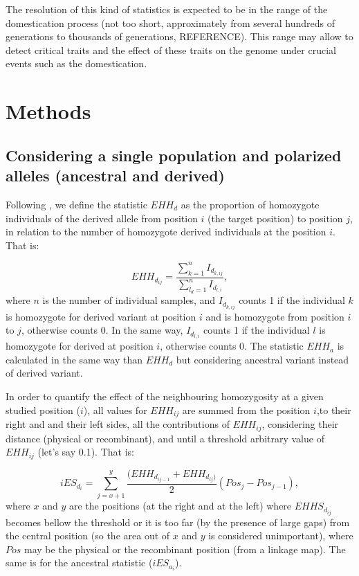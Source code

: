 \documentclass[a4paper,11pt]{article}
\begin{document}
The resolution of this kind of statistics is expected to be in the range of the domestication process (not too short, approximately from several hundreds of generations to  thousands of generations, REFERENCE). This range may allow to detect critical traits and the effect of these traits on the genome under crucial events such as the domestication.

\section{Methods}
\subsection{Considering a single population and polarized alleles (ancestral and derived)}
Following \cite{Sabeti:2002fv}, we define the statistic $EHH_d$ as the proportion of homozygote individuals of the derived allele from position $i$ (the target position) to position $j$, in relation to the number of homozygote derived individuals at the position $i$.  That is:

 \begin{equation}
 EHH_{d_{ij}} = \frac{\sum_{k=1}^{n}I_{d_{k,ij}}}{\sum_{l_d=1}^{n}I_{d_{l,i}}},
 \end{equation}
where $n$ is the number of individual samples, and $I_{d_{k,ij}}$ counts 1 if the individual $k$ is homozygote for derived variant at position $i$ and is homozygote from position $i$ to $j$, otherwise counts 0. In the same way, $I_{d_{l,i}}$ counts 1 if the individual $l$ is homozygote for derived at position $i$, otherwise counts 0. The statistic $EHH_a$ is calculated in the same way than $EHH_d$ but considering ancestral variant instead of derived variant.  

In order to quantify the effect of the neighbouring homozygosity at a given studied position ($i$),  all values for $EHH_{ij}$ are summed from  the position $i$,to their right and and their left sides, all the contributions of $EHH_{ij}$, considering their distance (physical or recombinant), and until a threshold arbitrary value of $EHH_{ij}$ (let's say 0.1). That is: 

\begin{equation}
 iES_{d_i} = \sum_{j=x+1}^{y}\frac{(EHH_{d_{ij-1}} + EHH_{d_{ij})}}{2} (Pos_{j} - Pos_{j-1}),
 \end{equation}
where $x$ and $y$ are the positions (at the right and at the left) where $EHHS_{d_{ij}}$ becomes bellow the threshold or it is too far (by the presence of large gaps) from the central position (so the area out of $x$ and $y$ is considered unimportant), where $Pos$ may be the physical or the recombinant position (from a linkage map). The same is for the ancestral statistic ($iES_{a_i}$).
\end{document}
